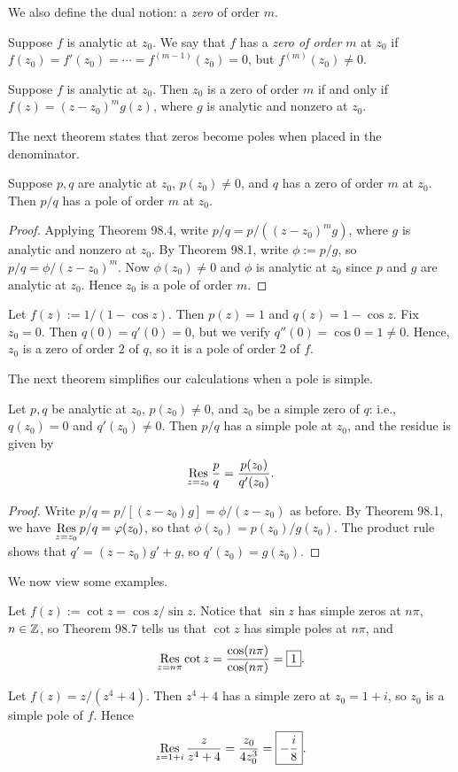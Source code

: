 \documentclass{article}
\begin{document}
We also define the dual notion: a \textit{zero} of order $m$.
\begin{definition}
Suppose $f$ is analytic at $z_0$. We say that $f$ has a \textit{zero of order $m$} at $z_0$ if $f(z_0) = f'(z_0) = \cdots = f^{(m-1)}(z_0) = 0$, but $f^{(m)}(z_0) \neq 0$.
\end{definition}
\begin{theorem}
Suppose $f$ is analytic at $z_0$. Then $z_0$ is a zero of order $m$ if and only if $f(z) = (z-z_0)^m g(z)$, where $g$ is analytic and nonzero at $z_0$.
\end{theorem}

The next theorem states that zeros become poles when placed in the denominator.
\begin{theorem}
Suppose $p, q$ are analytic at $z_0$, $p(z_0) \neq 0$, and $q$ has a zero of order $m$ at $z_0$. Then $p/q$ has a pole of order $m$ at $z_0$.
\end{theorem}
\begin{proof}
Applying Theorem 98.4, write $p/q = p/((z-z_0)^mg)$, where $g$ is analytic and nonzero at $z_0$. By Theorem 98.1, write $\phi := p/g$, so $p/q = \phi/ (z-z_0)^m$. Now $\phi(z_0) \neq 0$ and $\phi$ is analytic at $z_0$ since $p$ and $g$ are analytic at $z_0$. Hence $z_0$ is a pole of order $m$.
\end{proof}
\begin{example}
Let $f(z) := 1/(1-\cos z)$. Then $p(z) = 1$ and $q(z) = 1-\cos z$. Fix $z_0 = 0$. Then $q(0) = q'(0) = 0$, but we verify $q''(0) = \cos 0 = 1\neq 0$. Hence, $z_0$ is a zero of order $2$ of $q$, so it is a pole of order $2$ of $f$.
\end{example}
The next theorem simplifies our calculations when a pole is simple.
\begin{theorem}
Let $p,q$ be analytic at $z_0$, $p(z_0)\neq 0$, and $z_0$ be a simple zero of $q$: i.e., $q(z_0) = 0$ and $q'(z_0)\neq 0$. Then $p/q$ has a simple pole at $z_0$, and the residue is given by
$$\operatorname*{Res}_{z=z_0} \frac pq = \frac{p(z_0)}{q'(z_0)}.$$
\end{theorem}
\begin{proof}
Write $p/q = p/[(z-z_0)g] = \phi/(z-z_0)$ as before. By Theorem 98.1, we have $\displaystyle\operatorname*{Res}_{z=z_0} p/q = \varphi(z_0)$, so that $\phi(z_0) = p(z_0)/g(z_0)$. The product rule shows that $q' = (z-z_0)g' + g$, so $q'(z_0) = g(z_0)$. 
\end{proof}
We now view some examples. \newpage
\begin{example}
Let $f(z) := \cot z = \cos z/\sin z$. Notice that $\sin z$ has simple zeros at $n\pi$, $n\in\mathbb Z$, so Theorem 98.7 tells us that $\cot z$ has simple poles at $n\pi$, and
$$\operatorname*{Res}_{z=n\pi} \cot z = \frac{\cos(n\pi)}{\cos(n\pi )} = \boxed 1.$$
\end{example}
\begin{example}
Let $f(z) = z/(z^4+4)$. Then $z^4+4$ has a simple zero at $z_0 = 1+i$, so $z_0$ is a simple pole of $f$. Hence
$$\operatorname*{Res}_{z=1+i} \frac z{z^4+4} = \frac{z_0}{4z_0^3} = \boxed{-\frac i8}.$$
\end{example}
\setcounter{section}{99}
\end{document}
